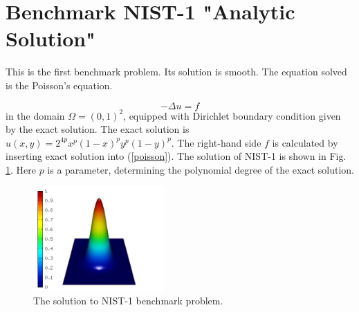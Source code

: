 \documentclass[12pt]{elsarticle}
\begin{document}

\section{Benchmark NIST-1 "Analytic Solution"}
\label{sec:bench-1}

This is the first benchmark problem. Its solution is smooth.
The equation solved is the Poisson's equation.

\begin{equation} \label{poisson}
-\Delta u = f
\end{equation}
in the domain $\Omega = (0, 1)^2$, equipped with Dirichlet
boundary condition given by the exact solution.
The exact solution is $u(x, y) = 2^{4p}x^{p}(1-x)^{p}y^{p}(1-y)^{p}$.
The right-hand side $f$ is calculated by inserting exact solution into (\ref{poisson}).
The solution of NIST-1 is shown in Fig. \ref{fig:sln-nist01}.
Here $p$ is a parameter, determining the polynomial degree of the exact solution.

\begin{figure}[H]
\centering
\includegraphics[height=4cm]{nist/nist-1/solution.png}
\vspace{-5mm}
\caption{The solution to NIST-1 benchmark problem.}
\vspace{-2mm}
\label{fig:sln-nist01}
\end{figure}
\end{document}
